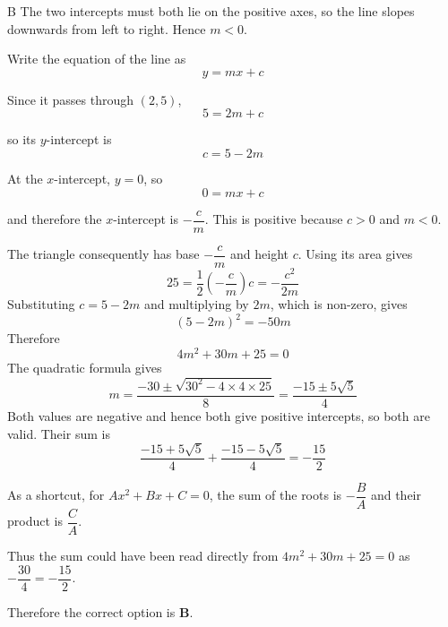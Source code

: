 \documentclass[11pt,a4paper]{article}
\begin{document}
\begin{enumerate}[label=\textbf{\arabic*.},leftmargin=*,itemsep=0pt,start=6]
\begin{djsSolution}{B}
The two intercepts must both lie on the positive axes, so the line slopes downwards from left to right. Hence $m<0$.

Write the equation of the line as
\[
y=mx+c
\]

Since it passes through $(2,5)$,
\[
5=2m+c
\]

so its $y$-intercept is
\[
c=5-2m
\]

At the $x$-intercept, $y=0$, so
\[
0=mx+c
\]

and therefore the $x$-intercept is $-\dfrac{c}{m}$. This is positive because $c>0$ and $m<0$.

The triangle consequently has base $-\dfrac{c}{m}$ and height $c$. Using its area gives
\[
25=\frac12\left(-\frac{c}{m}\right)c=-\frac{c^2}{2m}
\]
Substituting $c=5-2m$ and multiplying by $2m$, which is non-zero, gives
\[
(5-2m)^2=-50m
\]
Therefore
\[
4m^2+30m+25=0
\]
The quadratic formula gives
\[
m=\frac{-30\pm\sqrt{30^2-4\times4\times25}}{8}
 =\frac{-15\pm5\sqrt5}{4}
\]
Both values are negative and hence both give positive intercepts, so both are valid. Their sum is
\[
\frac{-15+5\sqrt5}{4}+\frac{-15-5\sqrt5}{4}
=-\frac{15}{2}
\]

As a shortcut, for $Ax^2+Bx+C=0$, the sum of the roots is $-\dfrac{B}{A}$ and their product is $\dfrac{C}{A}$.

Thus the sum could have been read directly from $4m^2+30m+25=0$ as $-\dfrac{30}{4}=-\dfrac{15}{2}$.

Therefore the correct option is \textbf{B}.
\end{djsSolution}
\end{enumerate}
\clearpage
\thispagestyle{djssolutions}
\vspace*{8pt}
\end{document}
